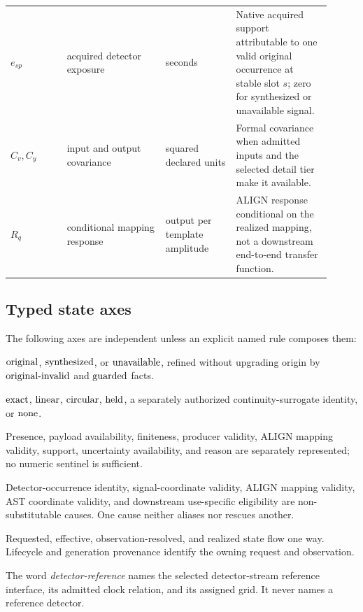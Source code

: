 \begin{longtable}{L{0.16\linewidth}L{0.28\linewidth}L{0.20\linewidth}L{0.27\linewidth}}
\(e_{sp}\) & acquired detector exposure & seconds & Native acquired support attributable to one valid original occurrence at stable slot \(s\); zero for synthesized or unavailable signal.\\
\(C_v,C_y\) & input and output covariance & squared declared units & Formal covariance when admitted inputs and the selected detail tier make it available.\\
\(R_q\) & conditional mapping response & output per template amplitude & ALIGN response conditional on the realized mapping, not a downstream end-to-end transfer function.\\
\bottomrule
\end{longtable}

\subsection{Typed state axes}

The following axes are independent unless an explicit named rule composes
them:

\begin{description}[style=nextline,leftmargin=0pt]
\item[Origin] \(\mathrm{original}\), \(\mathrm{synthesized}\), or
\(\mathrm{unavailable}\), refined without upgrading origin by
\(\mathrm{original\mbox{-}invalid}\) and \(\mathrm{guarded}\) facts.
\item[Method] \(\mathrm{exact}\), \(\mathrm{linear}\),
\(\mathrm{circular}\), \(\mathrm{held}\), a separately authorized
continuity-surrogate identity, or \(\mathrm{none}\).
\item[Availability and validity] Presence, payload availability, finiteness,
producer validity, ALIGN mapping validity, support, uncertainty availability,
and reason are separately represented; no numeric sentinel is sufficient.
\item[Five causes] Detector-occurrence identity, signal-coordinate validity,
ALIGN mapping validity, AST coordinate validity, and downstream use-specific
eligibility are non-substitutable causes.  One cause neither aliases nor
rescues another.
\item[Resolution state] Requested, effective, observation-resolved, and
realized state flow one way.  Lifecycle and generation provenance identify
the owning request and observation.
\end{description}

The word \emph{detector-reference} names the selected detector-stream
reference interface, its admitted clock relation, and its assigned grid.  It
never names a reference detector.
